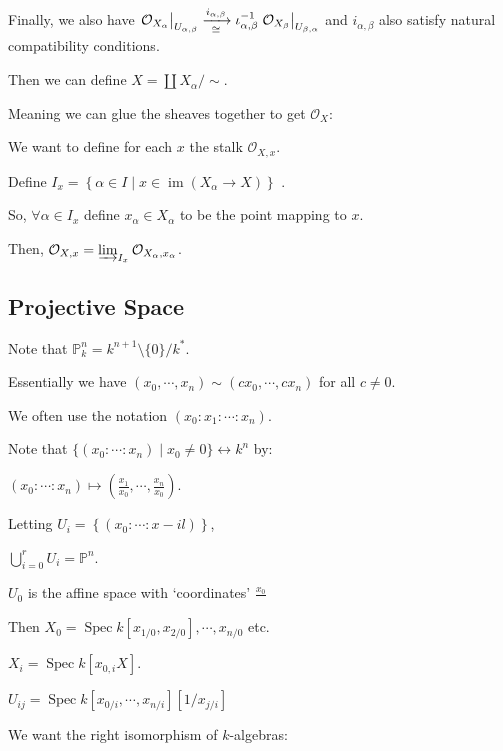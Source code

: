 \documentclass{article}
\theoremstyle{definition}
\begin{document}
    Finally, we also have \(\eval{\mathcal{O}_{X_\alpha}}_{U_{\alpha , \beta}} \xrightarrow[\cong]{i_{\alpha , \beta}} \iota_{\alpha,\beta} ^{-1} \eval{\mathcal{O}_{X_\beta}}_{U_{\beta,\alpha}}\) and \(i_{\alpha,\beta}\) also satisfy natural compatibility conditions.

    Then we can define \(X = \coprod X_\alpha / \sim\).

    Meaning we can glue the sheaves together to get \(\mathcal{O}_X\):

    We want to define for each \(x\) the stalk \(\mathcal{O}_{X,x}\).

    Define \(I_x = \left\{ \alpha \in I \mid x\in \operatorname{im} (X_\alpha \to X) \right\} \) .

    So, \(\forall \alpha \in I_x\) define \(x_\alpha \in X_\alpha\) to be the point mapping to \(x\).

    Then, \(\mathcal{O}_{X,x} = \varinjlim_{I_x} \mathcal{O}_{X_\alpha, x_\alpha}\).

    \subsection*{Projective Space}

    Note that \(\mathbb{P}^n_k = k^{n+1} \setminus \{ 0 \} / k^{\ast}\).

    Essentially we have \((x_0, \cdots , x_n) \sim (cx_0, \cdots , cx_n)\) for all \(c\neq 0\).

    We often use the notation \((x_0 : x_1 : \cdots : x_n)\).

    Note that \(\{ (x_0 : \cdots : x_n) \mid x_0 \neq 0 \} \leftrightarrow k^n \) by:
    
    \((x_0: \cdots : x_n) \mapsto \left( \frac{x_1}{x_0}, \cdots , \frac{x_n}{x_0} \right)\).
    
    Letting \(U_i = \left\{ (x_0 : \cdots : x-i l) \right\} \),

    \(\bigcup_{i=0}^r U_i = \mathbb{P}^ n\).

    \(U_0\) is the affine space with `coordinates' \(\frac{x_0}{}\) 

    Then \(X_0 = \operatorname{Spec} k[x_{1 / 0}, x_{2 / 0}], \cdots , x_{n / 0}\) etc.

    \(X_i = \operatorname{Spec} k[x_{0 , i}X]\).

    \(U_{ij} = \operatorname{Spec} k[x_{0 / i}, \cdots , x_{n / i }] [1 / x_{j / i}]\)
    
    We want the right isomorphism of \(k\)-algebras:
\end{document}
